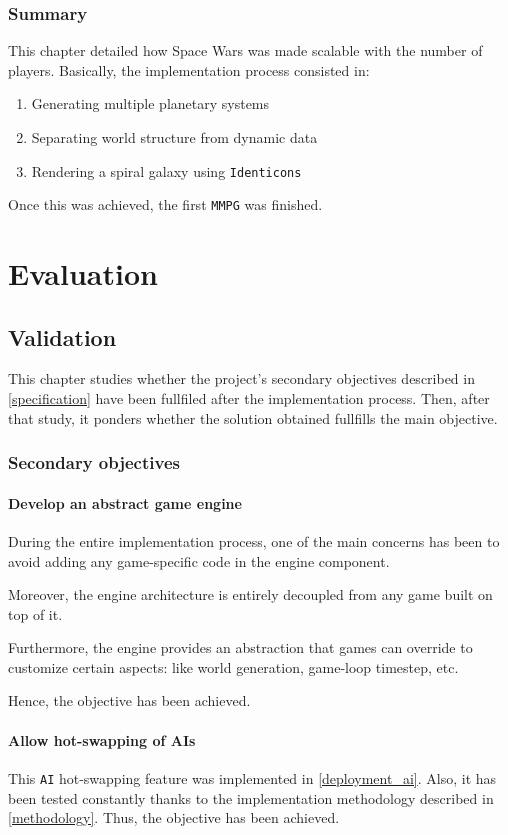\documentclass[a4paper,11pt,titlepage,abstract,numbers=noenddot,automark,mnsy,intlimits,rgb,dvipsnames]{report}
\begin{document}
\section{Summary}
This chapter detailed how Space Wars was made scalable with the number of players. Basically, the implementation
process consisted in:
\begin{enumerate}
\item
Generating multiple planetary systems
\item
Separating world structure from dynamic data
\item
Rendering a spiral galaxy using \texttt{Identicons}
\end{enumerate}
Once this was achieved, the first \texttt{MMPG} was finished.
\part{Evaluation}
\chapter{Validation}
\label{validation}
This chapter studies whether the project's secondary objectives described in \autoref{specification}
have been fullfiled after the implementation process. Then, after that study, it ponders whether
the solution obtained fullfills the main objective.
\section{Secondary objectives}
\subsection{Develop an abstract game engine}
During the entire implementation process, one of the main concerns has been to avoid adding any game-specific code
in the engine component.

Moreover, the engine architecture is entirely decoupled from any game built on
top of it.

Furthermore, the engine provides an abstraction that games can override to customize certain aspects:
like world generation, game-loop timestep, etc.

Hence, the objective has been achieved.
\subsection{Allow hot-swapping of AIs}
This \texttt{AI} hot-swapping feature was implemented in \autoref{deployment_ai}. Also, it has been tested constantly
thanks to the implementation methodology described in \autoref{methodology}. Thus, the objective has been achieved.
\end{document}
